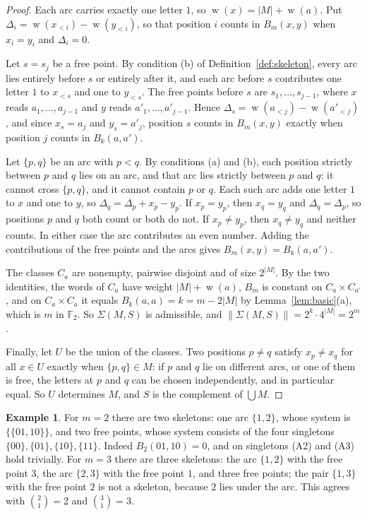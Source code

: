 \documentclass[11pt]{amsart}
\theoremstyle{definition}
\newtheorem{example}[theorem]{Example}
\theoremstyle{remark}
\numberwithin{equation}{section}
\newcommand{\F}{\mathbb{F}}
\DeclareMathOperator{\wt}{w}
\begin{document}
\begin{proof}
Each arc carries exactly one letter $1$, so $\wt(x)=|M|+\wt(a)$. Put $\Delta_i=\wt(x_{<i})-\wt(y_{<i})$, so that position $i$ counts in $B_m(x,y)$ when $x_i=y_i$ and $\Delta_i=0$.

Let $s=s_j$ be a free point. By condition (b) of Definition~\ref{def:skeleton}, every arc lies entirely before $s$ or entirely after it, and each arc before $s$ contributes one letter $1$ to $x_{<s}$ and one to $y_{<s}$. The free points before $s$ are $s_1,\dots,s_{j-1}$, where $x$ reads $a_1,\dots,a_{j-1}$ and $y$ reads $a'_1,\dots,a'_{j-1}$. Hence $\Delta_s=\wt(a_{<j})-\wt(a'_{<j})$, and since $x_s=a_j$ and $y_s=a'_j$, position $s$ counts in $B_m(x,y)$ exactly when position $j$ counts in $B_k(a,a')$.

Let $\{p,q\}$ be an arc with $p<q$. By conditions (a) and (b), each position strictly between $p$ and $q$ lies on an arc, and that arc lies strictly between $p$ and $q$: it cannot cross $\{p,q\}$, and it cannot contain $p$ or $q$. Each such arc adds one letter $1$ to $x$ and one to $y$, so $\Delta_q=\Delta_p+x_p-y_p$. If $x_p=y_p$, then $x_q=y_q$ and $\Delta_q=\Delta_p$, so positions $p$ and $q$ both count or both do not. If $x_p\ne y_p$, then $x_q\ne y_q$ and neither counts. In either case the arc contributes an even number. Adding the contributions of the free points and the arcs gives $B_m(x,y)=B_k(a,a')$.

The classes $C_a$ are nonempty, pairwise disjoint and of size $2^{|M|}$. By the two identities, the words of $C_a$ have weight $|M|+\wt(a)$, $B_m$ is constant on $C_a\times C_{a'}$, and on $C_a\times C_a$ it equals $B_k(a,a)=k=m-2|M|$ by Lemma~\ref{lem:basic}(a), which is $m$ in $\F_2$. So $\Sigma(M,S)$ is admissible, and $\|\Sigma(M,S)\|=2^k\cdot 4^{|M|}=2^m$.

Finally, let $U$ be the union of the classes. Two positions $p\ne q$ satisfy $x_p\ne x_q$ for all $x\in U$ exactly when $\{p,q\}\in M$: if $p$ and $q$ lie on different arcs, or one of them is free, the letters at $p$ and $q$ can be chosen independently, and in particular equal. So $U$ determines $M$, and $S$ is the complement of $\bigcup M$.
\end{proof}

\begin{example}\label{ex:smallm}
For $m=2$ there are two skeletons: one arc $\{1,2\}$, whose system is $\{\{01,10\}\}$, and two free points, whose system consists of the four singletons $\{00\},\{01\},\{10\},\{11\}$. Indeed $B_2(01,10)=0$, and on singletons (A2) and (A3) hold trivially. For $m=3$ there are three skeletons: the arc $\{1,2\}$ with the free point $3$, the arc $\{2,3\}$ with the free point $1$, and three free points; the pair $\{1,3\}$ with the free point $2$ is not a skeleton, because $2$ lies under the arc. This agrees with $\binom{2}{1}=2$ and $\binom{3}{1}=3$.
\end{example}
\end{document}
